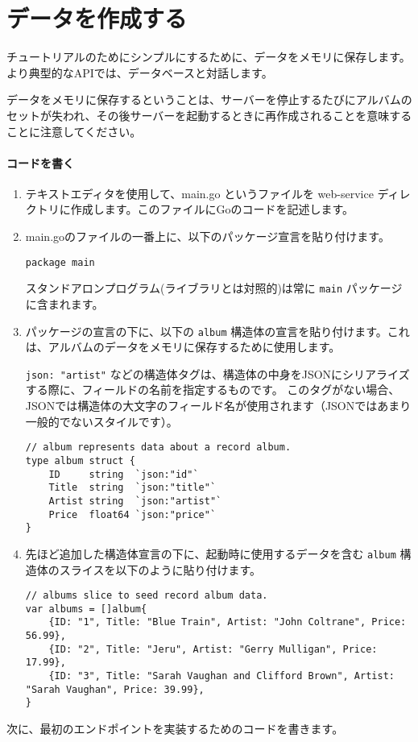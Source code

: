 
\section{データを作成する}

チュートリアルのためにシンプルにするために、データをメモリに保存します。より典型的なAPIでは、データベースと対話します。

データをメモリに保存するということは、サーバーを停止するたびにアルバムのセットが失われ、その後サーバーを起動するときに再作成されることを意味することに注意してください。

\paragraph{コードを書く}

\begin{enumerate}
\item
  テキストエディタを使用して、main.go というファイルを web-service
  ディレクトリに作成します。このファイルにGoのコードを記述します。
\item
  main.goのファイルの一番上に、以下のパッケージ宣言を貼り付けます。

\begin{lstlisting}[numbers=none]
package main
\end{lstlisting}



  スタンドアロンプログラム(ライブラリとは対照的)は常に \texttt{main}
  パッケージに含まれます。
\item
  パッケージの宣言の下に、以下の \texttt{album}
  構造体の宣言を貼り付けます。これは、アルバムのデータをメモリに保存するために使用します。

  \texttt{json:\ "artist"}
  などの構造体タグは、構造体の中身をJSONにシリアライズする際に、フィールドの名前を指定するものです。
  このタグがない場合、JSONでは構造体の大文字のフィールド名が使用されます（JSONではあまり一般的でないスタイルです）。

\begin{lstlisting}[numbers=none]
// album represents data about a record album.
type album struct {
    ID     string  `json:"id"`
    Title  string  `json:"title"`
    Artist string  `json:"artist"`
    Price  float64 `json:"price"`
}
\end{lstlisting}
\item
  先ほど追加した構造体宣言の下に、起動時に使用するデータを含む
  \texttt{album} 構造体のスライスを以下のように貼り付けます。

\begin{lstlisting}[numbers=none]
// albums slice to seed record album data.
var albums = []album{
    {ID: "1", Title: "Blue Train", Artist: "John Coltrane", Price: 56.99},
    {ID: "2", Title: "Jeru", Artist: "Gerry Mulligan", Price: 17.99},
    {ID: "3", Title: "Sarah Vaughan and Clifford Brown", Artist: "Sarah Vaughan", Price: 39.99},
}
\end{lstlisting}
\end{enumerate}

次に、最初のエンドポイントを実装するためのコードを書きます。
